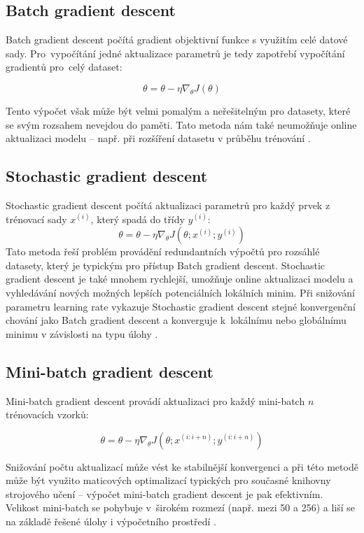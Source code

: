 \subsection*{Batch gradient descent}
Batch gradient descent počítá gradient objektivní funkce s využitím celé datové sady. Pro~vypočítání jedné aktualizace parametrů je tedy zapotřebí vypočítání gradientů pro~celý dataset: 

  \begin{equation} 
    \theta = \theta - \eta\nabla_{\theta}J(\theta)
    \end{equation} 

Tento výpočet však může být velmi pomalým a neřešitelným pro datasety, které se svým rozsahem nevejdou do paměti. Tato metoda nám také neumožňuje online aktualizaci modelu -- např. při rozšíření datasetu v průběhu trénování \cite{GradientDescent}.

\subsection*{Stochastic gradient descent}
Stochastic gradient descent počítá aktualizaci parametrů pro každý prvek z trénovací sady $x^{(i)}$, který spadá do třídy $y^{(i)}$:
  \begin{equation} 
    \theta = \theta - \eta\nabla_{\theta}J(\theta;x^{(i)};y^{(i)})
    \end{equation} 
Tato metoda řeší problém provádění redundantních výpočtů pro rozsáhlé datasety, který je typickým pro přístup Batch gradient descent. Stochastic gradient descent je také mnohem rychlejší, umožňuje online aktualizaci modelu a vyhledávání nových možných lepších potenciálních lokálních minim. Při snižování parametru learning rate vykazuje Stochastic gradient descent stejné konvergenční chování jako Batch gradient descent a konverguje k~lokálnímu nebo globálnímu minimu v závislosti na typu úlohy \cite{GradientDescent}.

\subsection*{Mini-batch gradient descent}
Mini-batch gradient descent provádí aktualizaci pro každý mini-batch $n$ trénovacích vzorků: 

\begin{equation} 
    \theta = \theta - \eta\nabla_{\theta}J(\theta;x^{(i:i+n)};y^{(i:i+n)})
    \end{equation} 

Snižování počtu aktualizací může vést ke stabilnější konvergenci a při této metodě může být využito maticových optimalizací typických pro současné knihovny strojového učení -- výpočet mini-batch gradient descent je pak efektivním. Velikost mini-batch se pohybuje v~širokém rozmezí (např. mezi 50 a 256) a liší se na základě řešené úlohy i výpočetního prostředí \cite{GradientDescent}. 



